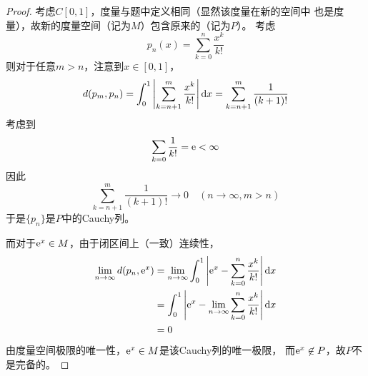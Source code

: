 \documentclass[cn]{homework}
\begin{document}
    \problem
    \begin{proof}
        考虑$C[0,1]$，度量与题中定义相同（显然该度量在新的空间中
        也是度量），故新的度量空间（记为$M$）包含原来的（记为$P$）。
        考虑
        \[p_n(x)=\sum_{k=0}^n\frac{x^k}{k!}\]
        则对于任意$m>n$，注意到$x\in[0,1]$，
        \[d(p_m,p_n)=\int_0^1\left|\sum_{k=n+1}^m\frac{x^k}{k!}\right|\mathrm d x
        =\sum_{k=n+1}^m\frac{1}{(k+1)!}\]
        考虑到
        \[\sum_{k=0}\frac{1}{k!}=\mathrm e<\infty\]
        因此
        \[\sum_{k=n+1}^m\frac{1}{(k+1)!}\to 0\quad(n\to\infty,m>n)\]
        于是$\{p_n\}$是$P$中的Cauchy列。

        而对于$\mathrm e^x\in M$，由于闭区间上（一致）连续性，
        \[\begin{aligned}
            \lim_{n\to\infty}d(p_n,\mathrm e^x)
            &=\lim_{n\to\infty}\int_0^1\left|\mathrm e^x-\sum_{k=0}^n\frac{x^k}{k!}\right|\mathrm d x\\
            &=\int_0^1\left|\mathrm e^x-\lim_{n\to\infty}\sum_{k=0}^n\frac{x^k}{k!}\right|\mathrm d x\\
            &=0
        \end{aligned}\]
        由度量空间极限的唯一性，$\mathrm e^x\in M$是该Cauchy列的唯一极限，
        而$\mathrm e^x\not\in P$，故$P$不是完备的。
    \end{proof}
\end{document}
